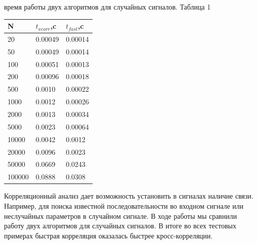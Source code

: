 \documentclass[a4paper,12pt]{article}
\begin{document}
\begin{enumerate}
{ время работы двух алгоритмов для случайных сигналов.
\flushright Таблица 1
\begin{center}
	\begin{tabular}{|p{3cm}|p{3cm}|p{3cm}|}
		\hline N&$t_{xcorr}$,c&$t_{fast}$,c \\
		\hline 20&0.00049&0.00014 \\
		\hline 50&0.00049&0.00014 \\
		\hline 100&0.00051&0.00013 \\
		\hline 200&0.00096&0.00018 \\
		\hline 500&0.0010&0.00022 \\
		\hline 1000&0.0012&0.00026 \\
		\hline 2000&0.0013&0.00034 \\
		\hline 5000&0.0023&0.00064\\
		\hline 10000&0.0042&0.0012 \\
		\hline 20000&0.0096&0.0023 \\
		\hline 50000&0.0669&0.0243 \\
		\hline 100000&0.0888&0.0308 \\
		\hline 
	\end{tabular}
\end{center}}

{\bfseries{}}

Корреляционный анализ дает возможность установить в сигналах наличие связи. Например, для поиска известной последовательности во входном сигнале или неслучайных параметров в случайном сигнале. В ходе работы мы сравнили работу двух алгоритмов для случайных сигналов. В итоге во всех тестовых примерах быстрая корреляция оказалась быстрее кросс-корреляции.

\end{enumerate}
\end{document}
